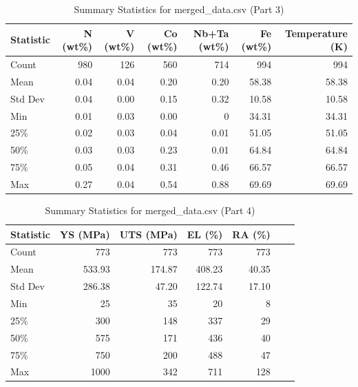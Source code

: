 \documentclass[10pt]{article}
\begin{document}
\begin{table}[htbp]
\centering
\caption{Summary Statistics for merged\_data.csv (Part 3)}
\label{tab:summary_stats_part3}
\begin{tabular}{lrrrrrr}
\toprule
Statistic & N (wt\%) & V (wt\%) & Co (wt\%) & Nb+Ta (wt\%) & Fe (wt\%) & Temperature (K) \\
\midrule
Count & 980 & 126 & 560 & 714 & 994 & 994 \\
Mean & 0.04 & 0.04 & 0.20 & 0.20 & 58.38 & 58.38 \\
Std Dev & 0.04 & 0.00 & 0.15 & 0.32 & 10.58 & 10.58 \\
Min & 0.01 & 0.03 & 0.00 & 0 & 34.31 & 34.31 \\
25\% & 0.02 & 0.03 & 0.04 & 0.01 & 51.05 & 51.05 \\
50\% & 0.03 & 0.03 & 0.23 & 0.01 & 64.84 & 64.84 \\
75\% & 0.05 & 0.04 & 0.31 & 0.46 & 66.57 & 66.57 \\
Max & 0.27 & 0.04 & 0.54 & 0.88 & 69.69 & 69.69 \\
\bottomrule
\end{tabular}
\end{table}

\begin{table}[htbp]
\centering
\caption{Summary Statistics for merged\_data.csv (Part 4)}
\label{tab:summary_stats_part4}
\begin{tabular}{lrrrrrr}
\toprule
Statistic & YS (MPa) & UTS (MPa) & EL (\%) & RA (\%) \\
\midrule
Count & 773 & 773 & 773 & 773 \\
Mean & 533.93 & 174.87 & 408.23 & 40.35 \\
Std Dev & 286.38 & 47.20 & 122.74 & 17.10 \\
Min & 25 & 35 & 20 & 8 \\
25\% & 300 & 148 & 337 & 29 \\
50\% & 575 & 171 & 436 & 40 \\
75\% & 750 & 200 & 488 & 47 \\
Max & 1000 & 342 & 711 & 128 \\
\bottomrule
\end{tabular}
\end{table}
\end{document}
